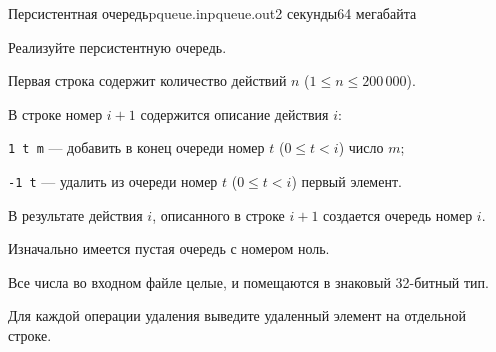 \begin{problem}{Персистентная очередь}{pqueue.in}{pqueue.out}{2 секунды}{64 мегабайта}

Реализуйте персистентную очередь.

\InputFile

Первая строка содержит количество действий $n$ ($1 \le n \le 200\,000$).

В строке номер $i + 1$ содержится описание действия $i$:

\begin{shortitems}
\item \texttt{1 t m} --- добавить в конец очереди номер $t$ ($0 \le t < i$) число $m$;
\item \texttt{-1 t} --- удалить из очереди номер $t$ ($0 \le t < i$) первый элемент.
\end{shortitems}

В результате действия $i$, описанного в строке $i + 1$ создается очередь номер $i$.

Изначально имеется пустая очередь с номером ноль.

Все числа во входном файле целые, и помещаются в знаковый 32-битный тип.


\OutputFile
Для каждой операции удаления выведите удаленный элемент на отдельной строке.

\Examples

\begin{example}
%
\end{example}

\end{problem}

